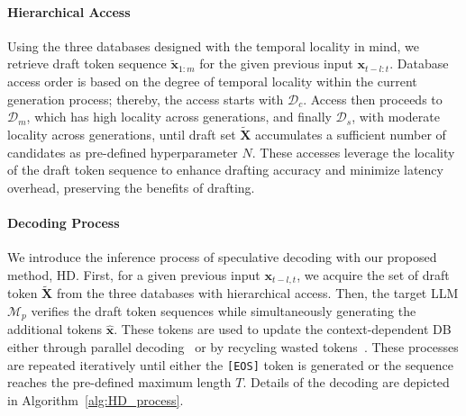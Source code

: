 

\paragraph{Hierarchical Access}
Using the three databases designed with the temporal locality in mind, we retrieve draft token sequence \(\bm{\tilde{x}}_{1:m}\) for the given previous input \(\bm{x}_{t-l:t}\).
Database access order is based on the degree of temporal locality within the current generation process; thereby, the access starts with \(\mathcal{D}_c\).
Access then proceeds to \(\mathcal{D}_m\), which has high locality across generations, and finally \(\mathcal{D}_s\), with moderate locality across generations, until draft set \(\bm{\tilde{X}}\) accumulates a sufficient number of candidates as pre-defined hyperparameter \(N\).
These accesses leverage the locality of the draft token sequence to enhance drafting accuracy and minimize latency overhead, preserving the benefits of drafting.

\paragraph{Decoding Process}
We introduce the inference process of speculative decoding with our proposed method, HD. 
First, for a given previous input \(\bm{x}_{t-l, t}\), we acquire the set of draft token \(\bm{\tilde{X}}\) from the three databases with hierarchical access. 
Then, the target LLM \(\mathcal{M}_p\) verifies the draft token sequences while simultaneously generating the additional tokens \(\bm{\hat{x}}\). 
These tokens are used to update the context-dependent DB either through parallel decoding~\cite{ParallelDecoding, LAD} or by recycling wasted tokens~\cite{trashintotreasure}. 
These processes are repeated iteratively until either the \texttt{[EOS]} token is generated or the sequence reaches the pre-defined maximum length \(T\).
Details of the decoding are depicted in Algorithm~\ref{alg:HD_process}.


